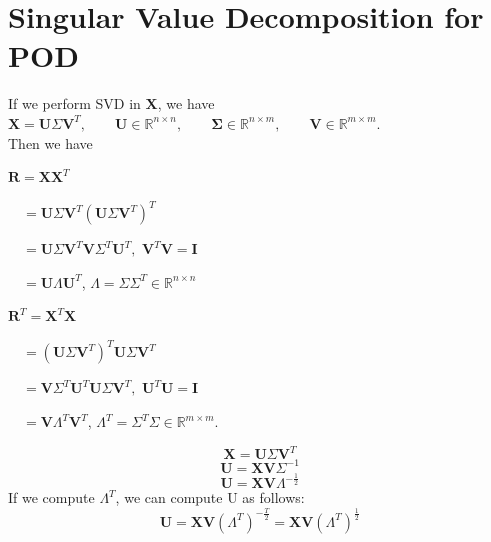 \documentclass[12pt]{article}
\begin{document}
\section{Singular Value Decomposition for POD}\label{a3}
If we perform SVD in $\mathbf{X}$, we have \\
$\mathbf{X}=\mathbf{U}\Sigma \mathbf{V}^T, \qquad \mathbf{U}\in\mathbb{R}^{n \times n},\qquad \mathbf{\Sigma}\in\mathbb{R}^{n \times m}, \qquad \mathbf{V}\in\mathbb{R}^{m \times m}.$\\
Then we have 
\begin{itemize}
\begin{minipage}{.5\textwidth}
\item[]  $\mathbf{R}= \mathbf{X}\mathbf{X}^T$
 \item[] $\quad=\mathbf{U}\Sigma \mathbf{V}^T(\mathbf{U}\Sigma \mathbf{V}^T)^T$
 \item[] $\quad=\mathbf{U}\Sigma \mathbf{V}^T\mathbf{V}\Sigma ^T\mathbf{U}^T,$ $\mathbf{V}^T\mathbf{V}=\mathbf{I}$ 
  \item[] $\quad=\mathbf{U}\Lambda \mathbf{U}^T$, 
  $\Lambda=\Sigma\Sigma ^T \in\mathbb{R}^{n \times n}$ 
\end{minipage}%
\begin{minipage}{.4\textwidth}
\item[] $\mathbf{R}^T= \mathbf{X}^T\mathbf{X}$
 \item[] $\quad=(\mathbf{U}\Sigma \mathbf{V}^T)^T\mathbf{U}\Sigma \mathbf{V}^T$
 \item[] $\quad=\mathbf{V}\Sigma ^T\mathbf{U}^T\mathbf{U}\Sigma \mathbf{V}^T,$ $\mathbf{U}^T\mathbf{U}=\mathbf{I}$ 
  \item[] $\quad=\mathbf{V}\Lambda^T \mathbf{V}^T$, 
  $\Lambda^T=\Sigma ^T\Sigma \in\mathbb{R}^{m \times m}.$
\end{minipage}
\end{itemize}
$$\mathbf{X}=\mathbf{U}\Sigma \mathbf{V}^T$$
$$\mathbf{U}=\mathbf{X}\mathbf{V}\Sigma^{-1}$$
$$\mathbf{U}=\mathbf{X}\mathbf{V}\Lambda^{-\frac{1}{2}}$$
If we compute $\Lambda^T$, we can compute U as follows:
$$\mathbf{U}=\mathbf{X}\mathbf{V}(\Lambda^T)^{-\frac{T}{2}}=\mathbf{X}\mathbf{V}(\Lambda^T)^{\frac{1}{2}}$$
\end{document}

